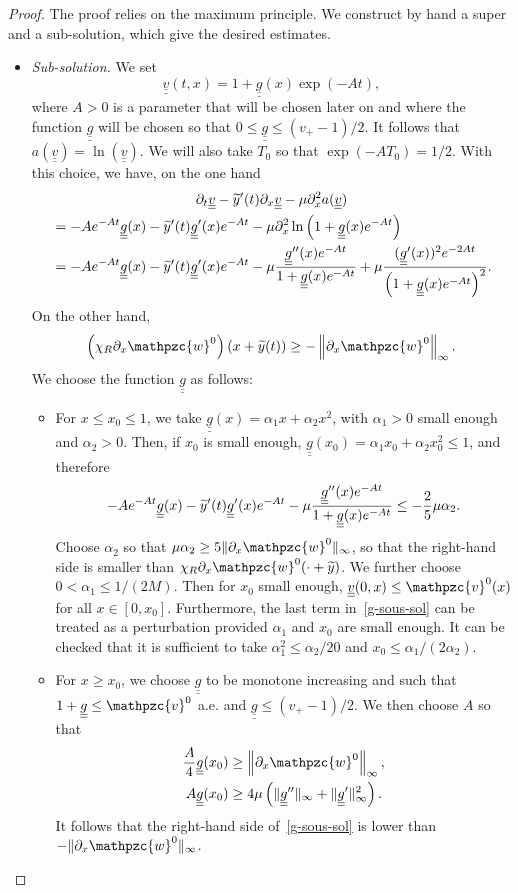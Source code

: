 \documentclass[AHL,Unicode,longabstracts,published]{cedram}
\newcommand{\p}{\partial}
\newcommand{\tv}{\mathpzc{v}}
\newcommand{\tw}{\mathpzc{w}}
\newcommand{\ty}{\widetilde{y}}
\newcommand{\uuv}{\underline{\underline{v}}}
\newcommand{\ug}{\underline{\underline{g}}}
\let\oldtilde\tilde
\renewcommand*{\tilde}[1]{\mathchoice{\widetilde{#1}}{\widetilde{#1}}{\oldtilde{#1}}{\oldtilde{#1}}}
\begin{document}
\begin{proof}
The proof relies on the maximum principle. We construct by hand a super and a sub-solution, which give the desired estimates.
\begin{itemize}
\item \emph{Sub-solution.} We set
\[
\uuv(t,x) = 1 + \ug(x) \exp(-A t),
\]
where $A>0$ is a parameter that will be chosen later on and where the function $\ug$ will be chosen so that $0\leq \ug \leq (v_+-1)/2$. It follows that $a(\uuv)=\ln (\uuv)$. We will also take $T_0$ so that $\exp(-A T_0)=1/2$. With this choice, we have, on the one hand
\begin{multline}\label{g-sous-sol}
\partial_t \uuv - \ty'(t)\partial_x \uuv - \mu \partial^2_x a (\uuv)\\
\begin{aligned}
&=- A e^{-At} \ug(x) - \tilde y'(t) \ug'(x) e^{-At} - \mu \p_x^2 \ln \left(1+ \ug(x) e^{-At}\right)\\
&=- A e^{-At} \ug(x) - \tilde y'(t) \ug'(x) e^{-At} -\mu\frac{\ug''(x) e^{-At}}{1+ \ug(x)e^{-At} } +\mu \frac{(\ug'(x))^2 e^{-2At}}{\left(1+ \ug(x)e^{-At}\right)^2}.
\end{aligned} 
\end{multline}
On the other hand,
\[
\left(\chi_R \p_x \tw^0\right)(x+ \ty(t)) \geq -\left\|\p_x \tw^0\right\|_\infty.
\]
We choose the function $\ug$ as follows:
\begin{itemize}
\item For $x\leq x_0\leq 1$, we take $\ug(x)= \alpha_1 x + \alpha_2 x^2$, with $\alpha_1>0$ small enough and $\alpha_2>0$. Then, if $x_0$ is small enough, $\ug(x_0) = \alpha_1 x_0 + \alpha_2 x_0^2 \leq 1$, and therefore
\[
- A e^{-At} \ug(x) - \tilde y'(t) \ug'(x) e^{-At} - \mu\frac{\ug''(x) e^{-At}}{1 + \ug(x)e^{-At} }
\leq -\frac{2}{5}{\mu \alpha_2}.
\]
Choose $\alpha_2$ so that $\mu \alpha_2\geq 5 \|\p_x \tw^0\|_\infty$, so that the right-hand side is smaller than $\chi_R \p_x \tw^0(\cdot + \ty)$. We further choose $0<\alpha_1\leq 1/(2M)$. Then for $x_0$ small enough, $\uuv(0,x)\leq \tv^0(x)$ for all $x\in [0,x_0]$. Furthermore, the last term in~\eqref{g-sous-sol} can be treated as a perturbation provided $\alpha_1$ and $x_0 $ are small enough. It can be checked that it is sufficient to take $\alpha_1^2\leq \alpha_2/{20}$ and $x_0\leq \alpha_1/(2\alpha_2)$.

\item For $x\geq x_0$, we choose $\ug$ to be monotone increasing and such that $1 + \ug \leq \tv^0$ a.e. and $\ug \leq (v_+-1)/2$. We then choose $A$ so that
\begin{align*}
\frac{A}{4} \ug(x_0) &\geq \left\|\p_x \tw^0\right\|_\infty,\\
A \ug(x_0)&\geq 4\mu \left(\|\ug''\|_\infty + \|\ug'\|_\infty^2\right).
\end{align*}
It follows that the right-hand side of~\eqref{g-sous-sol} is lower than $-\|\p_x \tw^0\|_\infty$.
\end{itemize}


\end{itemize}
\end{proof}
\end{document}
